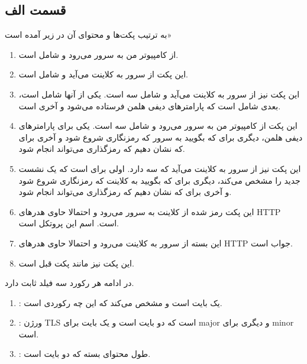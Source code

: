 \documentclass[]{article}
\begin{document}
\subsection*{قسمت الف}
به ترتیب پکت‌ها و محتوای آن در زیر آمده است»
\begin{enumerate}
    \item از کامپیوتر من به سرور می‌رود و شامل  است.
    \item این پکت از سرور به کلاینت می‌آید و شامل  است.
    \item این پکت نیز از سرور به کلاینت می‌آید و شامل سه  است. یکی از آنها شامل  است، بعدی شامل  است که پارامتر‌های دیفی هلمن فرستاده می‌شود و آخری  است.
    \item این پکت از کامپیوتر من به سرور می‌رود و شامل سه  است. یکی برای پارامتر‌های دیفی هلمن، دیگری برای  که بگویید به سرور که رمزنگاری شروع شود و آخری برای  که نشان دهیم که رمزگذاری می‌تواند انجام شود.
    \item این پکت نیز از سرور به کلاینت می‌آید که سه  دارد. اولی برای  است که یک نشست جدید را مشخص می‌کند، دیگری برای  که بگویید به کلاینت که رمزنگاری شروع شود و آخری برای  که نشان دهیم که رمزگذاری می‌تواند انجام شود.
    \item این پکت رمز شده از کلاینت به سرور می‌رود و احتمالا حاوی هدرهای HTTP است. اسم این پروتکل  است.
    \item این بسته از سرور به کلاینت می‌رود و احتمالا حاوی هدر‌های HTTP جواب است.
    \item این پکت نیز مانند پکت قبل است.
\end{enumerate}
در ادامه هر رکورد سه فیلد ثابت دارد.
\begin{enumerate}
    \item \textbf{}: یک بایت است و مشخص می‌کند که این چه رکوردی است.
    \item \textbf{}: ورژن TLS است که دو بایت است و یک بایت برای major و دیگری برای minor است.
    \item \textbf{}: طول محتوای بسته که دو بایت است.
\end{enumerate}
\end{document}
